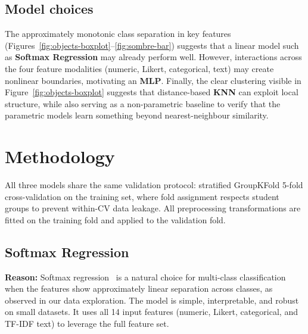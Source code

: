 \documentclass[12pt]{article}
\begin{document}
\subsection{Model choices}
The approximately monotonic class separation in key features (Figures~\ref{fig:objects-boxplot}--\ref{fig:sombre-bar}) suggests that a linear model such as \textbf{Softmax Regression} may already perform well. However, interactions across the four feature modalities (numeric, Likert, categorical, text) may create nonlinear boundaries, motivating an \textbf{MLP}. Finally, the clear clustering visible in Figure~\ref{fig:objects-boxplot} suggests that distance-based \textbf{KNN} can exploit local structure, while also serving as a non-parametric baseline to verify that the parametric models learn something beyond nearest-neighbour similarity.

\section{Methodology}

All three models share the same validation protocol: stratified GroupKFold 5-fold cross-validation on the training set, where fold assignment respects student groups to prevent within-CV data leakage. All preprocessing transformations are fitted on the training fold and applied to the validation fold.

\subsection{Softmax Regression}

\textbf{Reason:} Softmax regression~\cite{bishop2006prml} is a natural choice for multi-class classification when the features show approximately linear separation across classes, as observed in our data exploration. The model is simple, interpretable, and robust on small datasets. It uses all 14 input features (numeric, Likert, categorical, and TF-IDF text) to leverage the full feature set.
\end{document}
